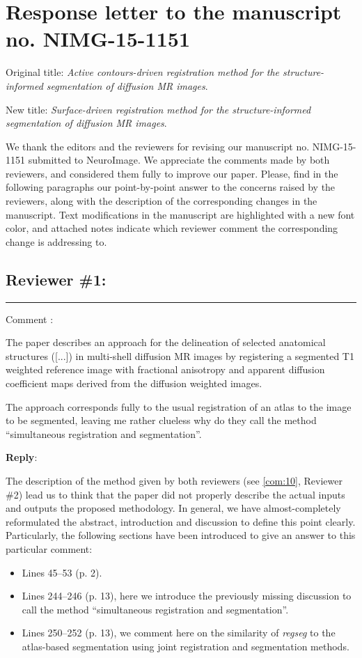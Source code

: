 \documentclass[9pt]{memoir}
\newcounter{reviewpoint}
\newenvironment{reviewpoint}%
{\refstepcounter{reviewpoint}\par\medskip\vspace{3ex}\hrule\vspace{1.5ex}\par\noindent%
   {\fontseries{b}\selectfont Comment \arabic{reviewpoint}:}
   \begingroup%
   \color{black!60}
   \fontshape{it}\selectfont %

}
{\endgroup\label{com:\thereviewpoint}\par\medskip}
\newcommand{\reply}{\par\fontshape{n}\selectfont \noindent \textbf{Reply}:\ }
\begin{document}
\hypersetup{linkcolor=black!60, citecolor=black!60, urlcolor=black!60}

\section*{Response letter to the manuscript no. NIMG-15-1151}
\medskip
Original title: \emph{Active contours-driven registration method for the structure-informed segmentation of
  diffusion MR images}.

\noindent New title: \emph{{\color{blue!70} Surface}-driven registration method for the structure-informed segmentation of
  diffusion MR images}.

\bigskip
\noindent We thank the editors and the reviewers for revising our manuscript no. NIMG-15-1151 submitted to NeuroImage.
We appreciate the comments made by both reviewers, and considered them fully to improve our paper.
Please, find in the following paragraphs our point-by-point answer to the concerns raised by the reviewers,
  along with the description of the corresponding changes in the manuscript.
Text modifications in the manuscript are highlighted with a new font color, and attached notes indicate which reviewer comment
  the corresponding change is addressing to.

\bigskip
\bigskip
\subsection*{Reviewer \#1:}
\begin{reviewpoint}
The paper describes an approach for the delineation of selected anatomical structures ([...]) in multi-shell diffusion MR images
  by registering a segmented T1 weighted reference image with fractional anisotropy and apparent diffusion coefficient maps derived
  from the diffusion weighted images.

The approach corresponds fully to the usual registration of an atlas to the image to be segmented, leaving me rather clueless why do
  they call the method ``simultaneous registration and segmentation''.

\end{reviewpoint}
\reply{%
The description of the method given by both reviewers (see \autoref{com:10}, Reviewer \#2) lead us to think that the paper
  did not properly describe the actual inputs and outputs the proposed methodology.
In general, we have almost-completely reformulated the abstract, introduction and discussion to define this
  point clearly.
Particularly, the following sections have been introduced to give an answer to this particular comment:
\begin{itemize}
\item Lines 45--53 (p. 2).
\item Lines 244--246 (p. 13), here we introduce the previously missing discussion to call the
  method ``simultaneous registration and segmentation''.
\item Lines 250--252 (p. 13), we comment here on the similarity of \emph{regseg} to the atlas-based segmentation
  using joint registration and segmentation methods.
\end{itemize}
}
\end{document}
